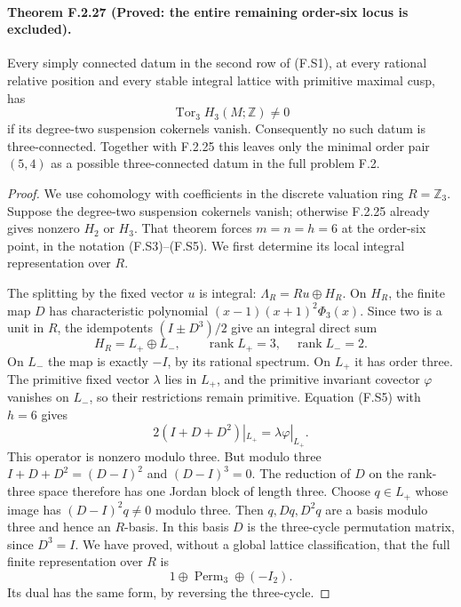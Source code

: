\paragraph{Theorem F.2.27 (Proved: the entire remaining order-six locus is excluded).}
Every simply connected datum in the second row of (F.S1),
at every rational relative position and every stable integral
lattice with primitive maximal cusp, has
\[
                 \operatorname{Tor}_3 H_3(M;\mathbb Z)\ne0
\]
if its degree-two suspension cokernels vanish.
Consequently no such datum is three-connected.  Together with
F.2.25 this leaves only the minimal order pair $(5,4)$ as a
possible three-connected datum in the full problem F.2.
\begin{proof}
We use cohomology with coefficients in the discrete valuation
ring $R=\mathbb Z_3$.  Suppose the degree-two suspension
cokernels vanish; otherwise F.2.25 already gives nonzero
$H_2$ or $H_3$.  That theorem forces $m=n=h=6$ at the
order-six point, in the notation (F.S3)--(F.S5).
We first determine its local integral representation over $R$.

The splitting by the fixed vector $u$ is integral:
$\Lambda_R=Ru\oplus H_R$.  On $H_R$, the finite map $D$
has characteristic polynomial
$(x-1)(x+1)^2\Phi_3(x)$.  Since two is a unit in $R$,
the idempotents $(I\pm D^3)/2$ give an integral direct sum
\[
 H_R=L_+\oplus L_-,\qquad
 \operatorname{rank}L_+=3,\quad
 \operatorname{rank}L_-=2.
\]
On $L_-$ the map is exactly $-I$, by its rational spectrum.
On $L_+$ it has order three.  The primitive fixed vector
$\lambda$ lies in $L_+$, and the primitive invariant
covector $\varphi$ vanishes on $L_-$, so their restrictions
remain primitive.  Equation (F.S5) with $h=6$ gives
\[
 2(I+D+D^2)|_{L_+}=\lambda\varphi|_{L_+}.
 \tag{F.X1}
\]
This operator is nonzero modulo three.  But modulo three
$I+D+D^2=(D-I)^2$ and $(D-I)^3=0$.  The reduction of $D$
on the rank-three space therefore has one Jordan block
of length three.  Choose $q\in L_+$ whose image has
$(D-I)^2q\ne0$ modulo three.  Then $q,Dq,D^2q$ are a
basis modulo three and hence an $R$-basis.  In this basis
$D$ is the three-cycle permutation matrix, since $D^3=I$.
We have proved, without a global lattice classification,
that the full finite representation over $R$ is
\[
                   1\oplus\operatorname{Perm}_3\oplus(-I_2).
 \tag{F.X2}
\]
Its dual has the same form, by reversing the three-cycle.


\end{proof}

